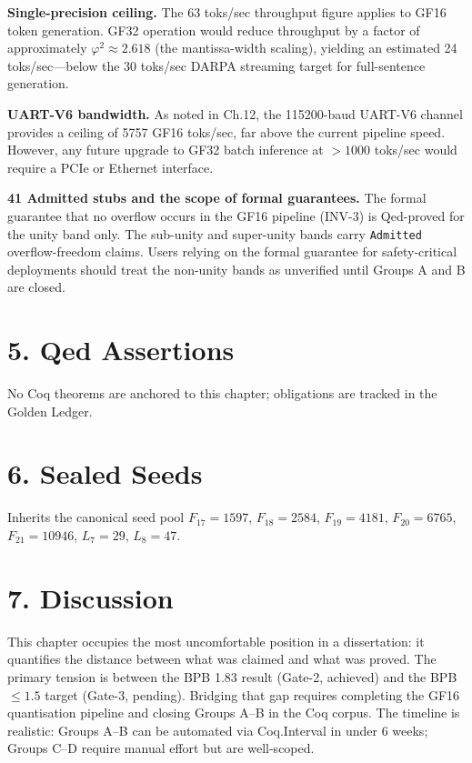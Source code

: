 \textbf{Single-precision ceiling.} The 63 toks/sec
throughput figure applies to GF16 token
generation. GF32 operation would reduce throughput
by a factor of approximately
\(\varphi^2 \approx 2.618\) (the mantissa-width
scaling), yielding an estimated 24
toks/sec---below the 30 toks/sec DARPA streaming
target for full-sentence generation.

\textbf{UART-V6 bandwidth.} As noted in Ch.12, the
115200-baud UART-V6 channel provides a ceiling of
5757 GF16 toks/sec, far above the current pipeline
speed. However, any future upgrade to GF32 batch
inference at \(> 1000\) toks/sec would require a
PCIe or Ethernet interface.

\textbf{41 Admitted stubs and the scope of formal
guarantees.} The formal guarantee that no overflow
occurs in the GF16 pipeline (INV-3) is Qed-proved
for the unity band only. The sub-unity and
super-unity bands carry \texttt{Admitted}
overflow-freedom claims. Users relying on the
formal guarantee for safety-critical deployments
should treat the non-unity bands as unverified
until Groups A and B are closed.

\section{5. Qed
Assertions}\label{fa_18:qed-assertions}

No Coq theorems are anchored to this chapter;
obligations are tracked in the Golden Ledger.

\section{6. Sealed Seeds}\label{fa_18:sealed-seeds}

Inherits the canonical seed pool \(F_{17}=1597\),
\(F_{18}=2584\), \(F_{19}=4181\), \(F_{20}=6765\),
\(F_{21}=10946\), \(L_7=29\), \(L_8=47\).

\section{7. Discussion}\label{fa_18:discussion}

This chapter occupies the most uncomfortable
position in a dissertation: it quantifies the
distance between what was claimed and what was
proved. The primary tension is between the BPB
1.83 result (Gate-2, achieved) and the BPB
\(\leq 1.5\) target (Gate-3, pending). Bridging
that gap requires completing the GF16 quantisation
pipeline and closing Groups A--B in the Coq
corpus. The timeline is realistic: Groups A--B can
be automated via Coq.Interval in under 6 weeks;
Groups C--D require manual effort but are
well-scoped.

